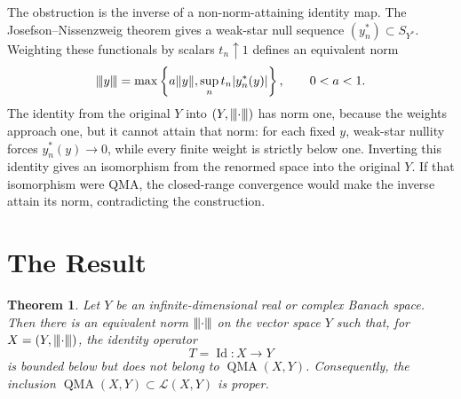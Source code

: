 \documentclass[11pt]{amsart}
\newtheorem{theorem}{Theorem}
\newcommand{\Lop}{\mathcal L}
\newcommand{\QMA}{\operatorname{QMA}}
\newcommand{\Id}{\operatorname{Id}}
\newcommand{\vertiii}[1]{{\left\vert\kern-0.25ex\left\vert\kern-0.25ex\left\vert #1
\right\vert\kern-0.25ex\right\vert\kern-0.25ex\right\vert}}
\begin{document}
The obstruction is the inverse of a non-norm-attaining identity map.  The
Josefson--Nissenzweig theorem gives a weak-star null sequence
\((y_n^*)\subset S_{Y^*}\).  Weighting these functionals by scalars
\(t_n\uparrow1\) defines an equivalent norm
\[
  \vertiii{y}=\max\left\{a\|y\|,\sup_n t_n |y_n^*(y)|\right\},
  \qquad 0<a<1.
\]
The identity from the original \(Y\) into \((Y,\vertiii{\cdot})\) has norm
one, because the weights approach one, but it cannot attain that norm:
for each fixed \(y\), weak-star nullity forces \(y_n^*(y)\to0\), while every
finite weight is strictly below one.  Inverting this identity gives an
isomorphism from the renormed space into the original \(Y\).  If that
isomorphism were QMA, the closed-range convergence would make the inverse
attain its norm, contradicting the construction.

\section*{The Result}

\begin{theorem}
Let \(Y\) be an infinite-dimensional real or complex Banach space. Then
there is an equivalent norm \(\vertiii{\cdot}\) on the vector space \(Y\)
such that, for \(X=(Y,\vertiii{\cdot})\), the identity operator
\[
  T=\Id:X\longrightarrow Y
\]
is bounded below but does not belong to \(\QMA(X,Y)\). Consequently, the
inclusion \(\QMA(X,Y)\subset \Lop(X,Y)\) is proper.
\end{theorem}
\end{document}
